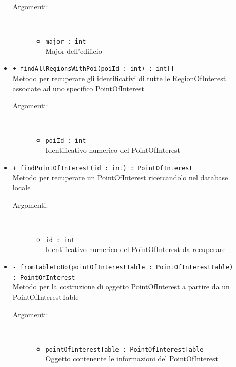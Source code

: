 \documentclass[../DefinizioneDiProdotto.tex]{subfiles}
\begin{document}
\begin{description}
\begin{itemize}
		\begin{description}
			\item[Argomenti:] \
			\begin{itemize}
				\item \texttt{major : int}\\
				Major dell'edificio\end{itemize}
		\end{description}
		\item \texttt{+ findAllRegionsWithPoi(poiId : int) : int[]}\\
		Metodo per recuperare gli identificativi di tutte le RegionOfInterest associate ad uno specifico PointOfInterest
		\begin{description}
			\item[Argomenti:] \
			\begin{itemize}
				\item \texttt{poiId : int}\\
				Identificativo numerico del PointOfInterest\end{itemize}
		\end{description}
		\item \texttt{+ findPointOfInterest(id : int) : PointOfInterest}\\
		Metodo per recuperare un PointOfInterest ricercandolo nel database locale
		\begin{description}
			\item[Argomenti:] \
			\begin{itemize}
				\item \texttt{id : int}\\
				Identificativo numerico del PointOfInterest da recuperare\end{itemize}
		\end{description}
		\item \texttt{- fromTableToBo(pointOfInterestTable : PointOfInterestTable) : PointOfInterest}\\
		Metodo per la costruzione di oggetto PointOfInterest a partire da un PointOfInterestTable
		\begin{description}
			\item[Argomenti:] \
			\begin{itemize}
				\item \texttt{pointOfInterestTable : PointOfInterestTable}\\
				Oggetto contenente le informazioni del PointOfInterest\end{itemize}
		\end{description}
	\end{itemize}
\end{description}
\end{document}
